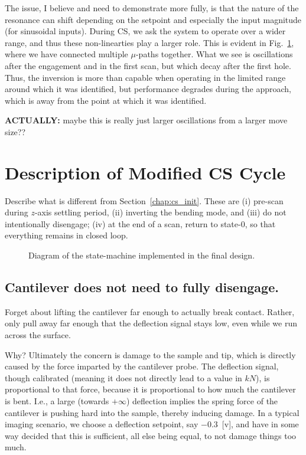 \documentclass[11pt]{article}
\begin{document}
The issue, I believe and need to demonstrate more fully, is that the nature of the resonance can shift depending on the setpoint and especially the input magnitude (for sinusoidal inputs). During CS, we ask the system to operate over a wider range, and thus these non-linearties play a larger role. This is evident in Fig.~\ref{fig:dinv_CS_decay}, where we have connected multiple $\mu$-paths together. What we see is oscillations after the engagement and in the first scan, but which decay after the first hole. Thus, the inversion is more than capable when operating in the limited range around which it was identified, but performance degrades during the approach, which is away from the point at which it was identified.

\textbf{ACTUALLY:} maybe this is really just larger oscillations from a larger move size??

\begin{figure}
  \centering
  
  \caption{}
  \label{fig:dinv_CS_decay}
\end{figure}

\section{Description of Modified CS Cycle}\label{sec:modfied_cs_cycle}
Describe what is different from Section~\ref{chap:cs_init}. These are (i) pre-scan during $z$-axis settling period, (ii) inverting the bending mode, and (iii) do not intentionally disengage; (iv) at the end of a scan, return to state-0, so that everything remains in closed loop.
\begin{figure}
  \centering
    
    \caption{Diagram of the state-machine implemented in the final design.}
    \label{fig:sm_final}
\end{figure}

\subsection{Cantilever does not need to fully disengage.} Forget about lifting the cantilever far enough to actually break contact. Rather, only pull away far enough that the deflection signal stays low, even while we run across the surface.

Why? Ultimately the concern is damage to the sample and tip, which is directly caused by the force imparted by the cantilever probe. The deflection signal, though calibrated (meaning it does not directly lead to a value in $kN$), is proportional to that force, because it is proportional to how much the cantilever is bent. I.e., a large (towards $+\infty$) deflection implies the spring force of the cantilever is pushing hard into the sample, thereby inducing damage. In a typical imaging scenario, we choose a deflection setpoint, say $-0.3$~[v], and have in some way decided that this is sufficient, all else being equal, to not damage things too much.
\end{document}
